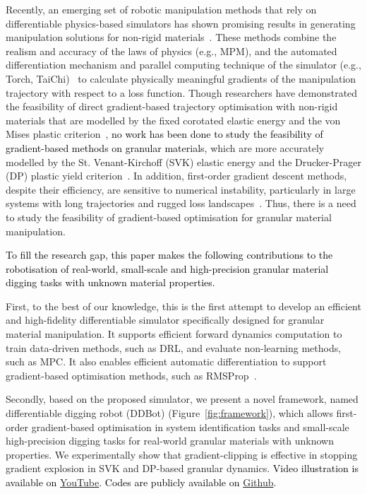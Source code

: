 \documentclass[letterpaper, 10 pt, journal, twoside]{ieeetran}
\newcommand{\rp}[1]{\textcolor{black}{#1}}
\newcommand{\rps}[1]{\textcolor{black}{#1}}
\begin{document}
Recently, an emerging set of robotic manipulation methods that rely on differentiable physics-based simulators has shown promising results in generating manipulation solutions for non-rigid materials~\cite{xu2021accelerated,chen2022diffsrl}. These methods combine the realism and accuracy of the laws of physics (e.g., MPM), and the automated differentiation mechanism and parallel computing technique of the simulator (e.g., Torch, TaiChi)~\cite{hu2019difftaichi,newbury2024review} to calculate physically meaningful gradients of the manipulation trajectory with respect to a loss function. Though researchers have demonstrated the feasibility of direct gradient-based trajectory optimisation with non-rigid materials that are modelled by the fixed corotated elastic energy and the von Mises plastic criterion~\cite{huang2021plasticinelab,xian2023fluidlab}, \rp{no work has been done to study the feasibility of gradient-based methods on granular materials}, which are more accurately modelled by the St. Venant-Kirchoff (SVK) elastic energy and the Drucker-Prager (DP) plastic yield criterion~\cite{klar2016drucker}. In addition, first-order gradient descent methods, despite their efficiency, are sensitive to numerical instability, particularly in large systems with long trajectories and rugged loss landscapes~\cite{wei2024automachef}. Thus, there is a need to study the feasibility of gradient-based optimisation for granular material manipulation.

\rp{To fill the research gap, this paper makes the following contributions to the robotisation of real-world, small-scale and high-precision granular material digging tasks with unknown material properties.}

First, to the best of our knowledge, this is the first attempt to develop an efficient and high-fidelity differentiable simulator specifically designed for granular material manipulation. It supports efficient forward dynamics computation to train data-driven methods, such as DRL, and evaluate non-learning methods, such as MPC. It also enables efficient automatic differentiation to support gradient-based optimisation methods, such as RMSProp~\cite{tieleman2012rmsprop}.

Secondly, based on the proposed simulator, we present a novel framework, named differentiable digging robot (DDBot) (Figure~\ref{fig:framework}), which allows first-order gradient-based optimisation in system identification tasks and small-scale high-precision digging tasks for real-world granular materials with unknown properties. We experimentally show that gradient-clipping is effective in stopping gradient explosion in SVK and DP-based granular dynamics. \rps{Video illustration is available on \href{https://www.youtube.com/watch?v=eoNx5V688H0}{YouTube}. Codes are publicly available on \href{https://github.com/IanYangChina/DDBot}{Github}.}
\end{document}
